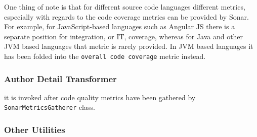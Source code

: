 One thing of note is that for different source code languages different metrics, especially with regards to the code coverage metrics can be provided by Sonar. For example, for JavaScript-based languages such as Angular JS there is a separate position for integration, or IT, coverage, whereas for Java and other JVM based languages that metric is rarely provided. In JVM based languages it has been folded into the \texttt{overall code coverage} metric instead.


\subsubsection{Author Detail Transformer}\label{sec:source-code:author-encoder}
it is invoked after code quality metrics have been gathered by \texttt{SonarMetricsGatherer} class.

\subsubsection{Other Utilities}


